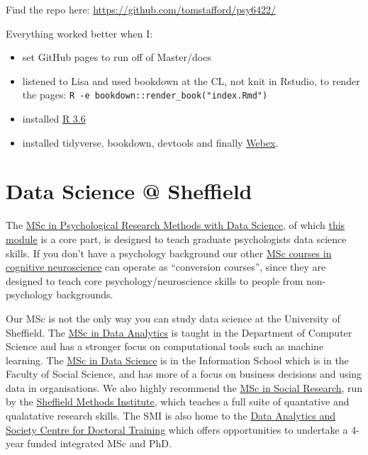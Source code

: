 \documentclass[
]{book}
\providecommand{\tightlist}{%
  \setlength{\itemsep}{0pt}\setlength{\parskip}{0pt}}
\begin{document}
Find the repo here: \url{https://github.com/tomstafford/psy6422/}

Everything worked better when I:

\begin{itemize}
\tightlist
\item
  set GitHub pages to run off of Master/docs
\item
  listened to Lisa and used bookdown at the CL, not knit in Rstudio, to render the pages: \texttt{R\ -e\ \textquotesingle{}bookdown::render\_book("index.Rmd")\textquotesingle{}}
\item
  installed \href{https://cran.r-project.org/bin/linux/ubuntu/README.html}{R 3.6}
\item
  installed tidyverse, bookdown, devtools and finally \href{https://github.com/PsyTeachR/webex}{Webex}.
\end{itemize}

\hypertarget{data-science-sheffield}{%
\section{Data Science @ Sheffield}\label{data-science-sheffield}}

The \href{https://www.sheffield.ac.uk/psychology/prospectivepg/masters/data-science}{MSc in Psychological Research Methods with Data Science}, of which \href{index.html}{this module} is a core part, is designed to teach graduate psychologists data science skills. If you don't have a psychology background our other \href{https://www.sheffield.ac.uk/psychology/prospectivepg/masters}{MSc courses in cognitive neuroscience} can operate as ``conversion courses'', since they are designed to teach core psychology/neuroscience skills to people from non-psychology backgrounds.

Our MSc is not the only way you can study data science at the University of Sheffield. The \href{https://www.sheffield.ac.uk/postgraduate/taught/courses/2020/data-analytics-msc}{MSc in Data Analytics} is taught in the Department of Computer Science and has a stronger focus on computational tools such as machine learning. The \href{https://www.sheffield.ac.uk/postgraduate/taught/courses/2020/data-science-msc}{MSc in Data Science} is in the Information School which is in the Faculty of Social Science, and has more of a focus on business decisions and using data in organisations. We also highly recommend the \href{https://www.sheffield.ac.uk/postgraduate/taught/courses/2020/social-research-ma}{MSc in Social Research}, run by the \href{https://www.sheffield.ac.uk/smi}{Sheffield Methods Institute}, which teaches a full suite of quantative and qualatative research skills. The SMI is also home to the \href{https://www.sheffield.ac.uk/smi/postgraduate/data-analytics-society-cdt}{Data Analytics and Society Centre for Doctoral Training} which offers opportunities to undertake a 4-year funded integrated MSc and PhD.
\end{document}
